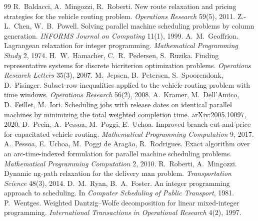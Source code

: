\documentclass[11pt,a4paper]{article}
\theoremstyle{definition}
\theoremstyle{remark}
\begin{document}
\begin{thebibliography}{99}\small
{} R.~Baldacci, A.~Mingozzi, R.~Roberti. New route
  relaxation and pricing strategies for the vehicle routing problem.
  \emph{Operations Research} 59(5), 2011.
 Z.-L.~Chen, W.~B.~Powell. Solving parallel machine
  scheduling problems by column generation. \emph{INFORMS Journal on
  Computing} 11(1), 1999.
 A.~M.~Geoffrion. Lagrangean relaxation for integer
  programming. \emph{Mathematical Programming Study} 2, 1974.
 H.~W.~Hamacher, C.~R.~Pedersen, S.~Ruzika. Finding
  representative systems for discrete bicriterion optimization problems.
  \emph{Operations Research Letters} 35(3), 2007.
 M.~Jepsen, B.~Petersen, S.~Spoorendonk, D.~Pisinger.
  Subset-row inequalities applied to the vehicle-routing problem with time
  windows. \emph{Operations Research} 56(2), 2008.
 A.~Kramer, M.~Dell'Amico, D.~Feillet, M.~Iori.
  Scheduling jobs with release dates on identical parallel machines by
  minimizing the total weighted completion time. arXiv:2005.10097, 2020.
 D.~Pecin, A.~Pessoa, M.~Poggi, E.~Uchoa. Improved
  branch-cut-and-price for capacitated vehicle routing. \emph{Mathematical
  Programming Computation} 9, 2017.
 A.~Pessoa, E.~Uchoa, M.~Poggi de Arag\~ao, R.~Rodrigues.
  Exact algorithm over an arc-time-indexed formulation for parallel machine
  scheduling problems. \emph{Mathematical Programming Computation} 2, 2010.
 R.~Roberti, A.~Mingozzi. Dynamic ng-path relaxation
  for the delivery man problem. \emph{Transportation Science} 48(3), 2014.
 D.~M.~Ryan, B.~A.~Foster. An integer programming approach
  to scheduling. In \emph{Computer Scheduling of Public Transport}, 1981.
 P.~Wentges. Weighted Dantzig--Wolfe decomposition for
  linear mixed-integer programming. \emph{International Transactions in
  Operational Research} 4(2), 1997.
\end{thebibliography}
\end{document}
